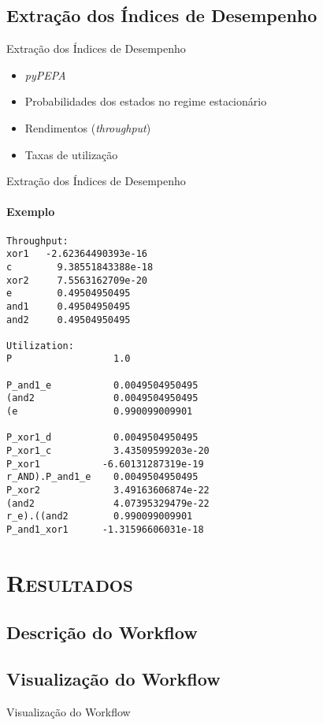 \documentclass[xcolor=x11names,compress]{beamer}
\renewcommand{\(}{\begin{columns}}
\renewcommand{\)}{\end{columns}}
\newcommand{\<}[1]{\begin{column}{#1}}
\renewcommand{\>}{\end{column}}
\begin{document}
    \subsection{Extração dos Índices de Desempenho}
        \begin{frame}{Extração dos Índices de Desempenho}
            \begin{itemize}[<+->]
                \item \emph{pyPEPA}
                \item Probabilidades dos estados no regime estacionário
                \item Rendimentos (\emph{throughput})
                \item Taxas de utilização
            \end{itemize}
        \end{frame}

\begin{frame}[fragile]{Extração dos Índices de Desempenho}
    \framesubtitle{Exemplo}
    \begin{lstlisting}[basicstyle=\tiny]
Throughput:
xor1   -2.62364490393e-16
c        9.38551843388e-18
xor2     7.5563162709e-20
e        0.49504950495
and1     0.49504950495
and2     0.49504950495

Utilization:
P                  1.0

P_and1_e           0.0049504950495
(and2              0.0049504950495
(e                 0.990099009901

P_xor1_d           0.0049504950495
P_xor1_c           3.43509599203e-20
P_xor1           -6.60131287319e-19
r_AND).P_and1_e    0.0049504950495
P_xor2             3.49163606874e-22
(and2              4.07395329479e-22
r_e).((and2        0.990099009901
P_and1_xor1      -1.31596606031e-18
    \end{lstlisting}
\end{frame}

\section{\scshape Resultados}

    \subsection{Descrição do Workflow}


    \subsection{Visualização do Workflow}
        \begin{frame}{Visualização do Workflow}

        \end{frame}
\end{document}

